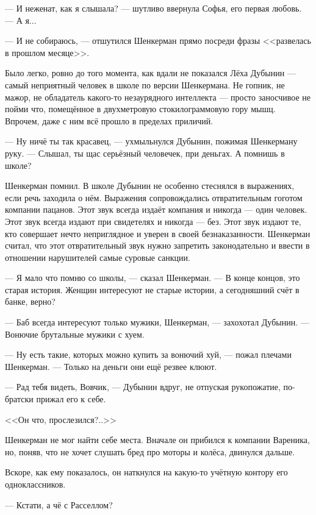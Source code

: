 --- И неженат, как я слышала? --- шутливо ввернула Софья, его первая любовь.
--- А я...

--- И не собираюсь, --- отшутился Шенкерман прямо посреди фразы <<развелась в прошлом месяце>>.

Было легко, ровно до того момента, как вдали не показался Лёха Дубынин --- самый неприятный человек в школе по версии Шенкермана.
Не гопник, не мажор, не обладатель какого-то незаурядного интеллекта --- просто заносчивое не пойми что, помещённое в двухметровую стокилограммовую гору мышц.
Впрочем, даже с ним всё прошло в пределах приличий.

--- Ну ничё ты так красавец, --- ухмыльнулся Дубынин, пожимая Шенкерману руку.
--- Слышал, ты щас серьёзный человечек, при деньгах.
А помнишь в школе?

Шенкерман помнил.
В школе Дубынин не особенно стеснялся в выражениях, если речь заходила о нём.
Выражения сопровождались отвратительным гоготом компании пацанов.
Этот звук всегда издаёт компания и никогда --- один человек.
Этот звук всегда издают при свидетелях и никогда --- без.
Этот звук издают те, кто совершает нечто неприглядное и уверен в своей безнаказанности.
Шенкерман считал, что этот отвратительный звук нужно запретить законодательно и ввести в отношении нарушителей самые суровые санкции.

--- Я мало что помню со школы, --- сказал Шенкерман.
--- В конце концов, это старая история.
Женщин интересуют не старые истории, а сегодняшний счёт в банке, верно?

--- Баб всегда интересуют только мужики, Шенкерман, --- захохотал Дубынин.
--- Вонючие брутальные мужики с хуем.

--- Ну есть такие, которых можно купить за вонючий хуй, --- пожал плечами Шенкерман.
--- Только на деньги они ещё резвее клюют.

--- Рад тебя видеть, Вовчик, --- Дубынин вдруг, не отпуская рукопожатие, по-братски прижал его к себе.

<<Он что, прослезился?..>>

\asterism

\textspace

Шенкерман не мог найти себе места.
Вначале он прибился к компании Вареника, но, поняв, что не хочет слушать бред про моторы и колёса, двинулся дальше.

Вскоре, как ему показалось, он наткнулся на какую-то учётную контору его одноклассников.

--- Кстати, а чё с Расселлом?

